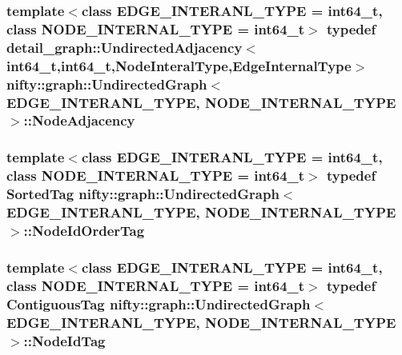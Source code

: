 \subsubsection[{Node\+Adjacency}]{\setlength{\rightskip}{0pt plus 5cm}template$<$class E\+D\+G\+E\+\_\+\+I\+N\+T\+E\+R\+A\+N\+L\+\_\+\+T\+Y\+P\+E = int64\+\_\+t, class N\+O\+D\+E\+\_\+\+I\+N\+T\+E\+R\+N\+A\+L\+\_\+\+T\+Y\+P\+E = int64\+\_\+t$>$ typedef detail\+\_\+graph\+::\+Undirected\+Adjacency$<$int64\+\_\+t,int64\+\_\+t,{\bf Node\+Interal\+Type},{\bf Edge\+Internal\+Type}$>$ {\bf nifty\+::graph\+::\+Undirected\+Graph}$<$ E\+D\+G\+E\+\_\+\+I\+N\+T\+E\+R\+A\+N\+L\+\_\+\+T\+Y\+P\+E, N\+O\+D\+E\+\_\+\+I\+N\+T\+E\+R\+N\+A\+L\+\_\+\+T\+Y\+P\+E $>$\+::{\bf Node\+Adjacency}\hspace{0.3cm}{\ttfamily [protected]}}\label{classnifty_1_1graph_1_1UndirectedGraph_ab50d4774bd9a93ac226589352866df69}
\hypertarget{classnifty_1_1graph_1_1UndirectedGraph_a0756fdeac9df76a32f46f2969ffacd80}{}
\subsubsection[{Node\+Id\+Order\+Tag}]{\setlength{\rightskip}{0pt plus 5cm}template$<$class E\+D\+G\+E\+\_\+\+I\+N\+T\+E\+R\+A\+N\+L\+\_\+\+T\+Y\+P\+E = int64\+\_\+t, class N\+O\+D\+E\+\_\+\+I\+N\+T\+E\+R\+N\+A\+L\+\_\+\+T\+Y\+P\+E = int64\+\_\+t$>$ typedef {\bf Sorted\+Tag} {\bf nifty\+::graph\+::\+Undirected\+Graph}$<$ E\+D\+G\+E\+\_\+\+I\+N\+T\+E\+R\+A\+N\+L\+\_\+\+T\+Y\+P\+E, N\+O\+D\+E\+\_\+\+I\+N\+T\+E\+R\+N\+A\+L\+\_\+\+T\+Y\+P\+E $>$\+::{\bf Node\+Id\+Order\+Tag}}\label{classnifty_1_1graph_1_1UndirectedGraph_a0756fdeac9df76a32f46f2969ffacd80}
\hypertarget{classnifty_1_1graph_1_1UndirectedGraph_a5d11b1e802f0be2f967b62f7ea5ff61e}{}
\subsubsection[{Node\+Id\+Tag}]{\setlength{\rightskip}{0pt plus 5cm}template$<$class E\+D\+G\+E\+\_\+\+I\+N\+T\+E\+R\+A\+N\+L\+\_\+\+T\+Y\+P\+E = int64\+\_\+t, class N\+O\+D\+E\+\_\+\+I\+N\+T\+E\+R\+N\+A\+L\+\_\+\+T\+Y\+P\+E = int64\+\_\+t$>$ typedef {\bf Contiguous\+Tag} {\bf nifty\+::graph\+::\+Undirected\+Graph}$<$ E\+D\+G\+E\+\_\+\+I\+N\+T\+E\+R\+A\+N\+L\+\_\+\+T\+Y\+P\+E, N\+O\+D\+E\+\_\+\+I\+N\+T\+E\+R\+N\+A\+L\+\_\+\+T\+Y\+P\+E $>$\+::{\bf Node\+Id\+Tag}}\label{classnifty_1_1graph_1_1UndirectedGraph_a5d11b1e802f0be2f967b62f7ea5ff61e}
\hypertarget{classnifty_1_1graph_1_1UndirectedGraph_aa3b43dd44281416b7232caae529e8780}{}
